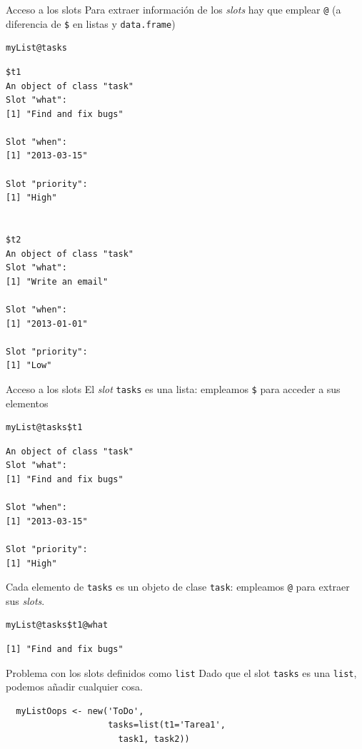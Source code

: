 \documentclass[xcolor={usenames,svgnames,dvipsnames}]{beamer}
\begin{document}
\begin{frame}[fragile,label={sec:org637be66}]{Acceso a los slots}
 Para extraer información de los \emph{slots} hay que emplear \texttt{@} (a
diferencia de \texttt{\$} en listas y \texttt{data.frame})
\lstset{language=r,label= ,caption= ,captionpos=b,numbers=none}
\begin{lstlisting}
myList@tasks
\end{lstlisting}

\begin{verbatim}
$t1
An object of class "task"
Slot "what":
[1] "Find and fix bugs"

Slot "when":
[1] "2013-03-15"

Slot "priority":
[1] "High"


$t2
An object of class "task"
Slot "what":
[1] "Write an email"

Slot "when":
[1] "2013-01-01"

Slot "priority":
[1] "Low"
\end{verbatim}
\end{frame}

\begin{frame}[fragile,label={sec:org216da52}]{Acceso a los slots}
 El \emph{slot} \texttt{tasks} es una lista: empleamos \texttt{\$} para acceder a sus elementos
\lstset{language=r,label= ,caption= ,captionpos=b,numbers=none}
\begin{lstlisting}
myList@tasks$t1
\end{lstlisting}

\begin{verbatim}
An object of class "task"
Slot "what":
[1] "Find and fix bugs"

Slot "when":
[1] "2013-03-15"

Slot "priority":
[1] "High"
\end{verbatim}

Cada elemento de \texttt{tasks} es un objeto de clase \texttt{task}: empleamos
\texttt{@} para extraer sus \emph{slots}.
\lstset{language=r,label= ,caption= ,captionpos=b,numbers=none}
\begin{lstlisting}
myList@tasks$t1@what
\end{lstlisting}

\begin{verbatim}
[1] "Find and fix bugs"
\end{verbatim}
\end{frame}

\begin{frame}[fragile,label={sec:org76a77bc}]{Problema con los slots definidos como \texttt{list}}
 Dado que el slot \texttt{tasks} es una \texttt{list}, podemos añadir cualquier
cosa. 
\lstset{language=r,label= ,caption= ,captionpos=b,numbers=none}
\begin{lstlisting}
  myListOops <- new('ToDo',
                    tasks=list(t1='Tarea1',
                      task1, task2))
\end{lstlisting}
\end{frame}
\end{document}
